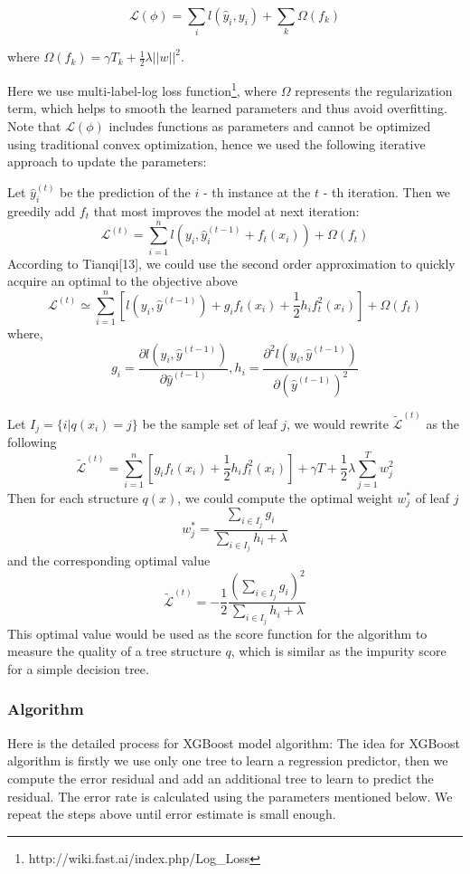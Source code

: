 \documentclass[letterpaper]{article}
\begin{document}
$$
\mathcal{L}(\phi) = \sum_{i} l(\hat y_i, y_i) + \sum_{k} \Omega(f_k)
$$

where $\Omega(f_{k}) = \gamma T_{k} + \frac{1}{2}\lambda ||w||^{2}$.

Here we use multi-label-log loss function\footnote{ http://wiki.fast.ai/index.php/Log\_Loss}, where $\Omega$ represents the regularization term, which helps to smooth the learned parameters and thus avoid overfitting. Note that $\mathcal{L}(\phi)$ includes functions as parameters and cannot be optimized using traditional convex optimization, hence we used the following iterative approach to update the parameters:

Let $\hat{y}_{i}^{(t)}$ be the prediction of the $i$ - th instance at the $t$ - th iteration. Then we greedily add $f_t$ that most improves the model at next iteration:
$$
\mathcal{L}^{(t)} = \sum_{i = 1}^nl(y_{i}, \hat{y}_{i}^{(t-1)} + f_{t}(x_i)) + \Omega(f_{t})
$$
According to Tianqi[13], we could use the second order approximation to quickly acquire an optimal to the objective above
$$
\mathcal{L}^{(t)} \simeq\sum_{i = 1}^n[l(y_i, \hat{y}^{(t-1)}) + g_if_t(x_i) + \frac{1}{2}h_if_t^2(x_i)] + \Omega(f_t)
$$
where, 
$$
g_i=\frac{\partial l(y_i, \hat{y}^{(t-1)})}{\partial\hat{y}^{(t-1)}},
h_i=\frac{\partial^2 l(y_i, \hat{y}^{(t-1)})}{\partial(\hat{y}^{(t-1)})^{2}}$$

Let $I_j = \{i| q(x_i) = j\}$ be the sample set of leaf $j$, we would rewrite $\tilde{\mathcal{L}}^{(t)}$ as the following
$$
\tilde{\mathcal{L}}^{(t)} = \sum_{i = 1}^n[g_if_t(x_i) + \frac{1}{2}h_if_t^2(x_i)] + \gamma T + \frac{1}{2}\lambda\sum_{j = 1}^Tw_j^2
$$
Then for each structure $q(x)$, we could compute the optimal weight $w_j^{*}$ of leaf $j$
$$
w_j^{*} = \frac{ \sum_{i \in I_j}g_i}{ \sum_{i \in I_j}h_i + \lambda}
$$
and the corresponding optimal value
$$
\tilde{\mathcal{L}}^{(t)}  = -\frac{1}{2}\frac{(\sum_{i \in I_j}g_i)^2}{\sum_{i \in I_j}h_i + \lambda}
$$
This optimal value would be used as the score function for the algorithm to measure the quality of a tree structure $q$, which is similar as the impurity score for a simple decision tree.

\subsubsection{Algorithm}

Here is the detailed process for XGBoost model algorithm:
The idea for XGBoost algorithm is firstly we use only one tree to learn a regression predictor, then we compute the error residual and add an additional tree to learn to predict the residual. The error rate is calculated using the parameters mentioned below. We repeat the steps above until error estimate is small enough.
\end{document}
